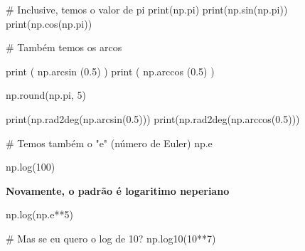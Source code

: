 \documentclass[
  letterpaper,
  DIV=11,
  numbers=noendperiod]{scrreprt}
\newenvironment{Shaded}{\begin{snugshade}}{\end{snugshade}}
\newcommand{\NormalTok}[1]{\textcolor[rgb]{0.00,0.23,0.31}{#1}}
\begin{document}
\begin{Shaded}
\begin{Highlighting}[]
\NormalTok{\# Inclusive, temos o valor de pi}
\NormalTok{print(np.pi)}
\NormalTok{print(np.sin(np.pi))}
\NormalTok{print(np.cos(np.pi))}
\end{Highlighting}
\end{Shaded}

\begin{Shaded}
\begin{Highlighting}[]
\NormalTok{\# Também temos os arcos}

\NormalTok{print ( np.arcsin (0.5) )}
\NormalTok{print ( np.arccos (0.5) )}
\end{Highlighting}
\end{Shaded}

\begin{Shaded}
\begin{Highlighting}[]
\NormalTok{np.round(np.pi, 5)}
\end{Highlighting}
\end{Shaded}

\begin{Shaded}
\begin{Highlighting}[]
\NormalTok{print(np.rad2deg(np.arcsin(0.5)))}
\NormalTok{print(np.rad2deg(np.arccos(0.5)))}
\end{Highlighting}
\end{Shaded}

\begin{Shaded}
\begin{Highlighting}[]
\NormalTok{\# Temos também o "e" (número de Euler)}
\NormalTok{np.e}
\end{Highlighting}
\end{Shaded}

\begin{Shaded}
\begin{Highlighting}[]
\NormalTok{np.log(100)}
\end{Highlighting}
\end{Shaded}

\textbf{Novamente, o padrão é logaritimo neperiano}

\begin{Shaded}
\begin{Highlighting}[]
\NormalTok{np.log(np.e**5)}
\end{Highlighting}
\end{Shaded}

\begin{Shaded}
\begin{Highlighting}[]
\NormalTok{\# Mas se eu quero o log de 10?}
\NormalTok{np.log10(10**7)}
\end{Highlighting}
\end{Shaded}
\end{document}
